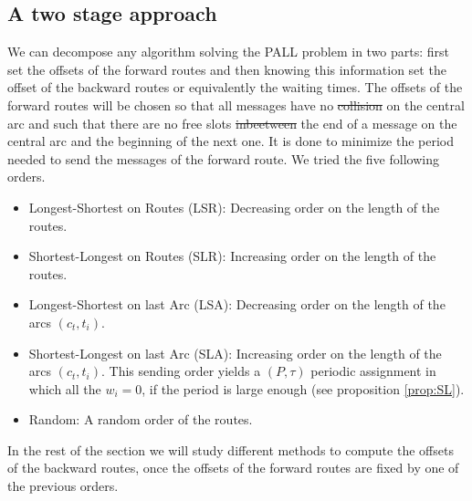 \documentclass[10pt, conference, letterpaper]{IEEEtran}
\providecommand{\DIFaddtex}[1]{{\protect\color{blue}\uwave{#1}}} %
\providecommand{\DIFdeltex}[1]{{\protect\color{red}\sout{#1}}}                      %
\providecommand{\DIFaddbegin}{} %
\providecommand{\DIFaddend}{} %
\providecommand{\DIFdelbegin}{} %
\providecommand{\DIFdelend}{} %
\providecommand{\DIFadd}[1]{\texorpdfstring{\DIFaddtex{#1}}{#1}} %
\providecommand{\DIFdel}[1]{\texorpdfstring{\DIFdeltex{#1}}{}} %
\newcommand{\DIFscaledelfig}{0.5}
\newlength{\DIFdelgraphicswidth} %
\newlength{\DIFdelgraphicsheight} %
\newcommand{\DIFaddincludegraphics}[2][]{{\color{blue}\fbox{\DIFOincludegraphics[#1]{#2}}}} %
\newcommand{\DIFdelincludegraphics}[2][]{%
\sbox{\DIFdelgraphicsbox}{\DIFOincludegraphics[#1]{#2}}%
\settoboxwidth{\DIFdelgraphicswidth}{\DIFdelgraphicsbox} %
\settoboxtotalheight{\DIFdelgraphicsheight}{\DIFdelgraphicsbox} %
\scalebox{\DIFscaledelfig}{%
\parbox[b]{\DIFdelgraphicswidth}{\usebox{\DIFdelgraphicsbox}\\[-\baselineskip] \rule{\DIFdelgraphicswidth}{0em}}\llap{\resizebox{\DIFdelgraphicswidth}{\DIFdelgraphicsheight}{%
\setlength{\unitlength}{\DIFdelgraphicswidth}%
\begin{picture}(1,1)%
\thicklines\linethickness{2pt} %
{\color[rgb]{1,0,0}\put(0,0){\framebox(1,1){}}}%
{\color[rgb]{1,0,0}\put(0,0){\line( 1,1){1}}}%
{\color[rgb]{1,0,0}\put(0,1){\line(1,-1){1}}}%
\end{picture}%
}\hspace*{3pt}}} %
} %
\DeclareRobustCommand{\DIFaddbegin}{\DIFOaddbegin \let\includegraphics\DIFaddincludegraphics} %
\DeclareRobustCommand{\DIFaddend}{\DIFOaddend \let\includegraphics\DIFOincludegraphics} %
\DeclareRobustCommand{\DIFdelbegin}{\DIFOdelbegin \let\includegraphics\DIFdelincludegraphics} %
\DeclareRobustCommand{\DIFdelend}{\DIFOaddend \let\includegraphics\DIFOincludegraphics} %
\begin{document}
    
     \subsection{A two stage approach}

     We can decompose any algorithm solving the PALL problem in two parts: first set the offsets of the forward routes and then knowing this information set the offset of the backward routes or equivalently the waiting times.  
     The offsets of the forward routes will be chosen so that all messages have no \DIFdelbegin \DIFdel{collision }\DIFdelend \DIFaddbegin \DIFadd{collisions }\DIFaddend on the central arc and such that there are no free slots \DIFdelbegin \DIFdel{inbeetween }\DIFdelend \DIFaddbegin \DIFadd{in between }\DIFaddend the end of a message on the central arc and the beginning of the next one. 
     It is done to minimize the period needed to send the messages of the forward route.
     We tried the five following orders. 
	\begin{itemize}

	 \item Longest-Shortest on Routes (LSR): Decreasing order on the length of the routes.
	 \item Shortest-Longest on Routes (SLR): Increasing order on the length of the routes. 
	 \item Longest-Shortest on last Arc (LSA): Decreasing order on the length of the arcs $(c_t,t_i)$.
	 \item Shortest-Longest on last Arc (SLA): Increasing order on the length of the arcs $(c_t,t_i)$. This sending order yields a $(P,\tau)$ periodic assignment in which all the $w_i = 0$, if the period is large enough (see proposition \ref{prop:SL}).
	 \item Random: A random order of the routes.
	\end{itemize}

   In the rest of the section we will study different methods to compute the offsets of the backward routes, once
   the offsets of the forward routes are fixed by one of the previous orders.
\end{document}
